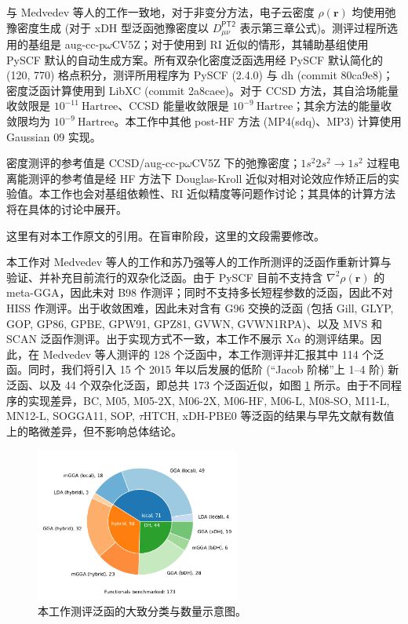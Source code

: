 与 Medvedev 等人的工作\cite{Medvedev-Lyssenko.S.2017}一致地，对于非变分方法，电子云密度 $\rho (\bm{r})$ 均使用弛豫密度生成 (对于 xDH 型泛函弛豫密度以 $D_{\mu \nu}^\textsf{PT2}$ 表示\alert{第三章公式})。测评过程所选用的基组是 aug-cc-p$\omega$CV5Z\cite{Dunning-Dunning.JCP.1989, Kendall-Harrison.JCP.1992, Peterson-Dunning.JCP.2002}；对于使用到 RI 近似的情形，其辅助基组使用 PySCF 默认的自动生成方案\cite{Stoychev-Neese.JCTC.2017}。所有双杂化密度泛函选用经 PySCF 默认简化的 (120, 770) 格点积分，测评所用程序为 PySCF (2.4.0)\cite{Sun-Chan.WCMS.2018, Sun-Chan.JCP.2020} 与 dh (commit 80ca9e8)；密度泛函计算使用到 LibXC (commit 2a8caee)\cite{Lehtola-Marques.S.2018}。对于 CCSD 方法，其自洽场能量收敛限是 $10^{-11} \ \text{Hartree}$、CCSD 能量收敛限是 $10^{-9} \ \text{Hartree}$；其余方法的能量收敛限均为 $10^{-9} \ \text{Hartree}$。本工作中其他 post-HF 方法 (MP4(sdq)、MP3) 计算使用 Gaussian 09 实现\cite{Gaussian09, Su-Xu.PNAS.2018}。

密度测评的参考值是 CCSD/aug-cc-p$\omega$CV5Z 下的弛豫密度；$1s^2 2s^2 \rightarrow 1s^2$ 过程电离能测评的参考值是经 HF 方法下 Douglas-Kroll 近似对相对论效应作矫正后的实验值\cite{Kepp-Kepp.S.2017, Douglas-Kroll.APY.1974, NIST.Atomic}。本工作也会对基组依赖性、RI 近似精度等问题作讨论；其具体的计算方法将在具体的讨论中展开。

\alert{这里有对本工作原文的引用。在盲审阶段，这里的文段需要修改。}

本工作对 Medvedev 等人的工作\cite{Medvedev-Lyssenko.S.2017}和苏乃强等人的工作\cite{Su-Xu.PNAS.2018}所测评的泛函作重新计算与验证、并补充目前流行的双杂化泛函。由于 PySCF 目前不支持含 $\nabla^2 \rho(\bm{r})$ 的 meta-GGA，因此未对 B98 作测评；同时不支持多长短程参数的泛函，因此不对 HISS 作测评。出于收敛困难，因此未对含有 G96 交换的泛函 (包括 Gill, GLYP, GOP, GP86, GPBE, GPW91, GPZ81, GVWN, GVWN1RPA)、以及 MVS 和 SCAN 泛函作测评。出于实现方式不一致，本工作不展示 X$\alpha$ 的测评结果。因此，在 Medvedev 等人测评的 128 个泛函中，本工作测评并汇报其中 114 个泛函。同时，我们将引入 15 个 2015 年以后发展的低阶 (“Jacob 阶梯”上 1--4 阶) 新泛函、以及 44 个双杂化泛函，即总共 173 个泛函近似，如图 \ref{fig.functionals-distribution} 所示。由于不同程序的实现差异，BC, M05, M05-2X, M06-2X, M06-HF, M06-L, M08-SO, M11-L, MN12-L, SOGGA11, SOP, $\tau$HTCH, xDH-PBE0 等泛函的结果与早先文献有数值上的略微差异，但不影响总体结论。

\begin{figure}[hp]
    \centering
    \caption{本工作测评泛函的大致分类与数量示意图。}
    \label{fig.functionals-distribution}
    \includegraphics[width=0.6\textwidth]{assets/functionals-distribution.pdf}
\end{figure}

